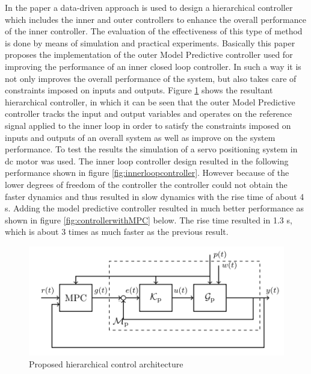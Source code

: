 \documentclass[]{final_report}
\begin{document}
In the paper \cite{piga2017direct} a data-driven approach is used to design a hierarchical controller which includes the inner and outer controllers to enhance the overall performance of the inner controller. The evaluation of the effectiveness of this type of method is done by means of simulation and practical experiments. Basically this paper proposes the implementation of the outer Model Predictive controller used for improving the performance of an inner closed loop controller. In such a way it is not only improves the overall performance of the system, but also takes care of constraints imposed on inputs and outputs. Figure \ref{fig:hierarchicalcontroller} shows the resultant hierarchical controller, in which it can be seen that the outer Model Predictive controller tracks the input and output variables and operates on the reference signal applied to the inner loop in order to satisfy the constraints imposed on inputs and outputs of an overall system as well as improve on the system performance. To test the results the simulation of a servo positioning system in dc motor was used. The inner loop controller design resulted in the following performance shown in figure \ref{fig:innerloopcontroller}. However because of the lower degrees of freedom of the controller the controller could not obtain the faster dynamics and thus resulted in slow dynamics with the rise time of about 4 s. Adding the model predictive controller resulted in much better performance as shown in figure \ref{fig:controllerwithMPC} below. The rise time resulted in 1.3 s, which is about 3 times as much faster as the previous result. 

\begin{figure} [h!]
\centerline{\includegraphics[width=.75\textwidth]{Screenshots for related work/constraint_data_driven_control_screenshot1.png}}
\caption{Proposed hierarchical control architecture
\cite{piga2017direct}}
\label{fig:hierarchicalcontroller}
\end{figure}
\end{document}
